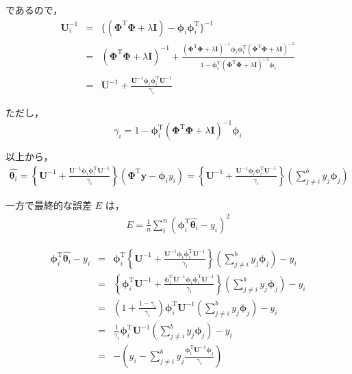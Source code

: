 \documentclass[fleqn]{jsarticle}
\begin{document}
  であるので，
  \begin{eqnarray*}
    \mathbf{U}_i^{-1} &=& \{ (\mathbf{\Phi}^\mathrm{T} \mathbf{\Phi} + \lambda \mathbf{I}) - \mathbf{\phi}_i \mathbf{\phi}_i^\mathrm{T} \}^{-1}\\
    &=& (\mathbf{\Phi}^\mathrm{T} \mathbf{\Phi} + \lambda \mathbf{I})^{-1} +
      \frac{(\mathbf{\Phi}^\mathrm{T} \mathbf{\Phi} + \lambda \mathbf{I})^{-1} \mathbf{\phi}_i \mathbf{\phi}_i^\mathrm{T} (\mathbf{\Phi}^\mathrm{T} \mathbf{\Phi} + \lambda \mathbf{I})^{-1}}
        {1 - \mathbf{\phi}_i^\mathrm{T} (\mathbf{\Phi}^\mathrm{T} \mathbf{\Phi} + \lambda \mathbf{I})^{-1} \mathbf{\phi}_i}\\
    &=& \mathbf{U}^{-1} + \frac{\mathbf{U}^{-1} \mathbf{\phi}_i \mathbf{\phi}_i^\mathrm{T} \mathbf{U}^{-1}}{\gamma_i}
  \end{eqnarray*}

  ただし，
  \begin{equation*}
    \gamma_i = 1 - \mathbf{\phi}_i^\mathrm{T} (\mathbf{\Phi}^\mathrm{T} \mathbf{\Phi} + \lambda \mathbf{I})^{-1} \mathbf{\phi}_i
  \end{equation*}

  以上から，
  \begin{eqnarray*}
    \hat{\mathbf{\theta}_i} = \left\{ \mathbf{U}^{-1} + \frac{\mathbf{U}^{-1} \mathbf{\phi}_i \mathbf{\phi}_i^\mathrm{T} \mathbf{U}^{-1}}{\gamma_i} \right\}
      (\mathbf{\Phi}^\mathrm{T} \mathbf{y} - \mathbf{\phi}_i y_i)
    = \left\{ \mathbf{U}^{-1} + \frac{\mathbf{U}^{-1} \mathbf{\phi}_i \mathbf{\phi}_i^\mathrm{T} \mathbf{U}^{-1}}{\gamma_i} \right\}
      \left( \sum_{j \neq i}^b y_j \mathbf{\phi}_j \right)
  \end{eqnarray*}

  一方で最終的な誤差 $E$ は，
  \begin{eqnarray*}
    E = \frac{1}{n} \sum_i^n \left(\mathbf{\phi}_i^\mathrm{T} \hat{\mathbf{\theta}_i} - y_i \right)^2
  \end{eqnarray*}

  \begin{eqnarray*}
    \mathbf{\phi}_i^\mathrm{T} \hat{\mathbf{\theta}_i} - y_i &=&
      \mathbf{\phi}_i^\mathrm{T} \left\{ \mathbf{U}^{-1} + \frac{\mathbf{U}^{-1} \mathbf{\phi}_i \mathbf{\phi}_i^\mathrm{T} \mathbf{U}^{-1}}{\gamma_i} \right\}
      \left( \sum_{j \neq i}^b y_j \mathbf{\phi}_j \right) - y_i\\
    &=& \left\{ \mathbf{\phi}_i^\mathrm{T} \mathbf{U}^{-1} + \frac{\mathbf{\phi}_i^\mathrm{T} \mathbf{U}^{-1} \mathbf{\phi}_i \mathbf{\phi}_i^\mathrm{T} \mathbf{U}^{-1}}{\gamma_i} \right\}
      \left( \sum_{j \neq i}^b y_j \mathbf{\phi}_j \right) - y_i\\
    &=& \left( 1 + \frac{1-\gamma_i}{\gamma_i} \right) \mathbf{\phi}_i^\mathrm{T} \mathbf{U}^{-1} \left( \sum_{j \neq i}^b y_j \mathbf{\phi}_j \right) - y_i\\
    &=& \frac{1}{\gamma_i} \mathbf{\phi}_i^\mathrm{T} \mathbf{U}^{-1} \left( \sum_{j \neq i}^b y_j \mathbf{\phi}_j \right) - y_i\\
    &=& - \left( y_i - \sum_{j \neq i}^b y_j \frac{ \mathbf{\phi}_i^\mathrm{T} \mathbf{U}^{-1} \mathbf{\phi}_j }{\gamma_i} \right)
  \end{eqnarray*}
\end{document}
